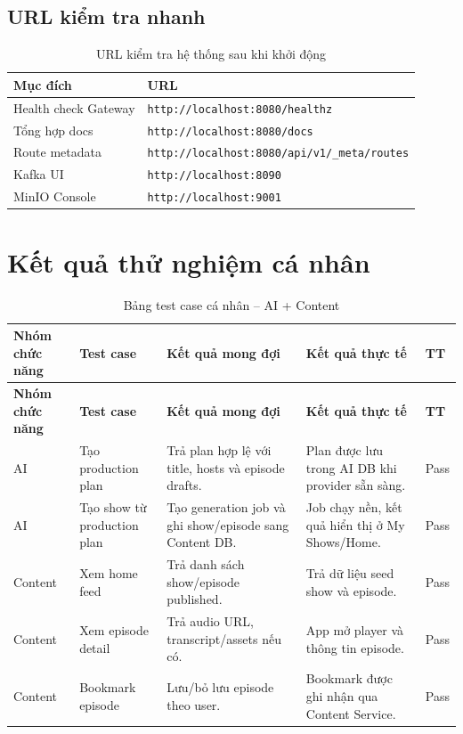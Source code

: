\documentclass[14pt,a4paper,oneside]{extreport}
\begin{document}
\subsection{URL kiểm tra nhanh}

\begin{table}[H]
\centering
\caption{URL kiểm tra hệ thống sau khi khởi động}
\label{tab:url-kiem-tra}
\renewcommand{\arraystretch}{1.3}
\small
\begin{tabularx}{\textwidth}{|l|X|}
\hline
\textbf{Mục đích} & \textbf{URL} \\
\hline
Health check Gateway & \texttt{http://localhost:8080/healthz} \\
\hline
Tổng hợp docs & \texttt{http://localhost:8080/docs} \\
\hline
Route metadata & \texttt{http://localhost:8080/api/v1/\_meta/routes} \\
\hline
Kafka UI & \texttt{http://localhost:8090} \\
\hline
MinIO Console & \texttt{http://localhost:9001} \\
\hline
\end{tabularx}
\end{table}

\section{Kết quả thử nghiệm cá nhân}
\label{sec:ket-qua-thu-nghiem}

\begin{longtable}{|p{2.8cm}|p{4.0cm}|p{4.3cm}|p{3.0cm}|p{1.6cm}|}
\caption{Bảng test case cá nhân -- AI + Content}
\label{tab:test-case}\\
\hline
\textbf{Nhóm chức năng} & \textbf{Test case} & \textbf{Kết quả mong đợi} & \textbf{Kết quả thực tế} & \textbf{TT} \\
\hline
\endfirsthead
\hline
\textbf{Nhóm chức năng} & \textbf{Test case} & \textbf{Kết quả mong đợi} & \textbf{Kết quả thực tế} & \textbf{TT} \\
\hline
\endhead
AI & Tạo production plan & Trả plan hợp lệ với title, hosts và episode drafts. & Plan được lưu trong AI DB khi provider sẵn sàng. & Pass \\
\hline
AI & Tạo show từ production plan & Tạo generation job và ghi show/episode sang Content DB. & Job chạy nền, kết quả hiển thị ở My Shows/Home. & Pass \\
\hline
Content & Xem home feed & Trả danh sách show/episode published. & Trả dữ liệu seed show và episode. & Pass \\
\hline
Content & Xem episode detail & Trả audio URL, transcript/assets nếu có. & App mở player và thông tin episode. & Pass \\
\hline
Content & Bookmark episode & Lưu/bỏ lưu episode theo user. & Bookmark được ghi nhận qua Content Service. & Pass \\
\hline
\end{longtable}
\end{document}
